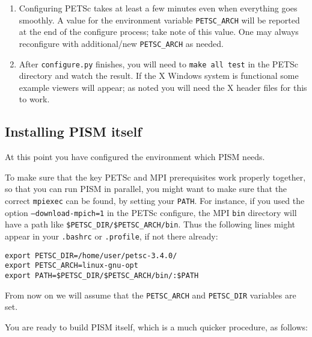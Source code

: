 \documentclass[titlepage,letterpaper,final]{scrartcl}
\begin{document}
\begin{enumerate}
\item  Configuring PETSc takes at least a few minutes even when everything goes smoothly.   A value for the environment variable \texttt{PETSC_ARCH} will be reported at the end of the configure process; take note of this value.  One may always reconfigure with additional/new \texttt{PETSC_ARCH} as needed.

\item  After \texttt{configure.py} finishes, you will need to \texttt{make all test} in the PETSc directory and watch the result.  If the X Windows system is functional some example viewers will appear; as noted you will need the X header files for this to work.
\end{enumerate}

\subsection{Installing PISM itself}
\label{sec:install-cmake}
At this point you have configured the environment which PISM needs.

To make sure that the key PETSc and MPI prerequisites work properly together, so that you can run PISM in parallel, you might want to make sure that the correct \texttt{mpiexec} can be found, by setting your \texttt{PATH}.  For instance, if you used the option \texttt{--download-mpich=1} in the PETSc configure, the MPI \texttt{bin} directory will have a path like \texttt{\$PETSC_DIR/\$PETSC_ARCH/bin}.  Thus the following lines might appear in your \texttt{.bashrc} or \texttt{.profile}, if not there already:
\begin{verbatim}
export PETSC_DIR=/home/user/petsc-3.4.0/
export PETSC_ARCH=linux-gnu-opt
export PATH=$PETSC_DIR/$PETSC_ARCH/bin/:$PATH
\end{verbatim}
From now on we will assume that the \texttt{PETSC_ARCH} and \texttt{PETSC_DIR} variables are set.

You are ready to build PISM itself, which is a much quicker procedure, as follows:
\end{document}
